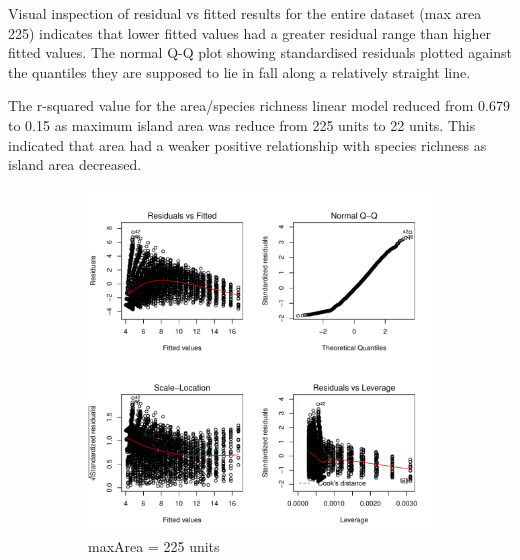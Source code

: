 \documentclass{article}
\begin{document}
Visual inspection of residual vs fitted results for the entire dataset (max area 225) indicates that lower fitted values had a greater residual range than higher fitted values. The normal Q-Q plot showing standardised residuals plotted against the quantiles they are supposed to lie in fall along a relatively straight line.  \bigskip

The r-squared value for the area/species richness linear model reduced from 0.679 to 0.15 as maximum island area was reduce from 225 units to 22 units. This indicated that area had a weaker positive relationship with species richness as island area decreased. \bigskip

\begin{figure}[h!]
  \centering
  \begin{subfigure}[b]{0.4\linewidth}
    \includegraphics[width=\linewidth]{../../Results/Simulation/AreaSpeciesLmPlot_1.pdf}
    \caption{maxArea = 225 units}
  \end{subfigure}
  \begin{subfigure}[b]{0.4\linewidth}

\end{subfigure}
\end{figure}
\end{document}
